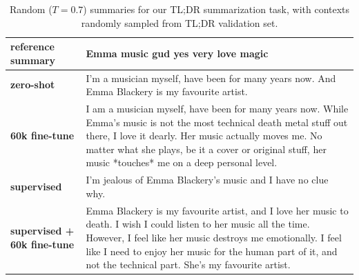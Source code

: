 \begin{table}[t]
\begin{center}
\begin{tabular}{|p{2cm}|p{12cm}|}
\textbf{reference summary}
&
Emma music gud yes very love magic
\\
\hline
\hline

\textbf{zero-shot}
&
I'm a musician myself, have been for many years now. And Emma Blackery is my favourite artist.
\\
\hline
\textbf{60k fine-tune}
&
I am a musician myself, have been for many years now. While Emma's music is not the most technical death metal stuff out there, I love it dearly. Her music actually moves me. No matter what she plays, be it a cover or original stuff, her music *touches* me on a deep personal level.
\\
\hline
\textbf{supervised}
&
I'm jealous of Emma Blackery's music and I have no clue why.
\\
\hline
\textbf{supervised + 60k fine-tune}
&
Emma Blackery is my favourite artist, and I love her music to death. I wish I could listen to her music all the time. However, I feel like her music destroys me emotionally. I feel like I need to enjoy her music for the human part of it, and not the technical part. She's my favourite artist.
\\
\hline

\end{tabular}
\caption{Random ($T=0.7$) summaries for our TL;DR summarization task, with contexts randomly sampled from TL;DR validation set.}
\label{tab:samples-summarization-tldr}
\end{center}
\end{table}
    

